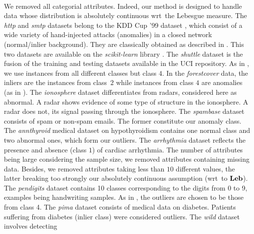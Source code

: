 \paragraph{}
We removed all categorial attributes. Indeed, our method is designed to handle
data whose distribution is absolutely continuous \acs{wrt}~the Lebesgue
measure.
%
The \emph{http} and \emph{smtp} datasets belong to the \acs{KDD} Cup '99
dataset \citep{KDD99, Tavallaee2009}, which consist of a wide variety of
hand-injected attacks (anomalies) in a closed network (normal/inlier
background). They are classically obtained as described in
\citet{Yamanishi2000}. This two datasets are available on the
\emph{scikit-learn} library \citep{pedregosa2011scikit}. The \emph{shuttle}
dataset is the fusion of the training and testing datasets available in the
\acs{UCI} repository. As in \citet{Liu2008}, we use instances from all
different classes but class $4$.
In the \emph{forestcover} data, the inliers are the instances from class~$2$
while instances from class $4$ are anomalies (as in \citet{Liu2008}).
The \emph{ionosphere} dataset differentiates  from  radars,
considered here as abnormal. A  radar shows evidence of some type of
structure in the ionosphere. A  radar does not, its signal passing
through the ionosphere.
The \emph{spambase} dataset consists of spam or non-spam emails. The former
constitute our anomaly class.  The \emph{annthyroid} medical dataset on
hypothyroidism contains one normal class and two abnormal ones, which form our
outliers.
The \emph{arrhythmia} dataset reflects the presence and absence (class $1$) of
cardiac arrhythmia. The number of attributes being large considering the sample
size, we removed attributes containing missing data.  Besides, we removed
attributes taking less than $10$ different values, the latter breaking too
strongly our absolutely continuous assumption (\acs{wrt}~to $\mathbf{Leb}$).
The \emph{pendigits} dataset contains 10 classes corresponding to the digits
from 0 to 9, examples being handwriting samples. As in \citet{Schubert2012},
the outliers are chosen to be those from class 4.  The \emph{pima} dataset
consists of medical data on diabetes. Patients suffering from diabetes (inlier
class) were considered outliers.  The \emph{wild} dataset involves detecting
